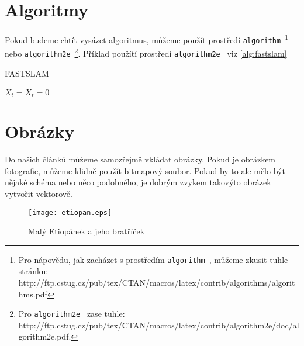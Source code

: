 \documentclass[a4paper,11pt]{article}
\newcommand*{\mojetttext}[1]{\: \texttt{#1}\ }
\begin{document}
\section{Algoritmy}
\label{sec:algoritmy}

Pokud budeme chtít vysázet algoritmus, můžeme použít prostředí \mojetttext{algorithm}\footnote{Pro nápovědu, jak zacházet s prostředím \mojetttext{algorithm}, můžeme zkusit tuhle stránku:\\http://ftp.cstug.cz/pub/tex/CTAN/macros/latex/contrib/algorithms/algorithms.pdf} nebo \mojetttext{algorithm2e}\footnote{Pro \mojetttext{algorithm2e} zase tuhle: http://ftp.cstug.cz/pub/tex/CTAN/macros/latex/contrib/algorithm2e/doc/algorithm2e.pdf.}.
Příklad použítí prostředí \mojetttext{algorithm2e} viz \ref{alg:fastslam}

\begin{algorithm}
    \SetNlSty{}{}{:}
    \SetNlSkip{-1em}
    \caption{F{\footnotesize AST}SLAM}
    \label{alg:fastslam}
    \BlankLine
    \Indp
    \Indp
    $\overline{X_t} = X_t = 0$\;


\end{algorithm}

\section{Obrázky}
Do našich článků můžeme samozřejmě vkládat obrázky. Pokud je obrázkem fotografie, můžeme klidně použít bitmapový soubor.
Pokud by to ale mělo být nějaké schéma nebo něco podobného, je dobrým zvykem takovýto obrázek vytvořit vektorově.

\begin{figure}[!ht]
    \centering
    \texttt{[image: etiopan.eps]}
    \caption{Malý Etiopánek a jeho bratříček}
    \label{img:etiopianek}
\end{figure}
\end{document}
